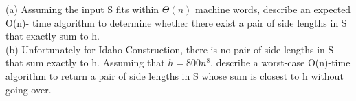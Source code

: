 \documentclass[12pt]{amsart}
\begin{document}
(a) Assuming the input S fits within $\Theta(n)$ machine words, describe an expected O(n)-
time algorithm to determine whether there exist a pair of side lengths in S that exactly
sum to h. 
\\

(b) Unfortunately for Idaho Construction, there is no pair of side lengths in S that sum exactly to h.
Assuming that $h = 800n^{8}$, describe a worst-case O(n)-time algorithm to return a pair
of side lengths in S whose sum is closest to h without going over. 
\end{document}

